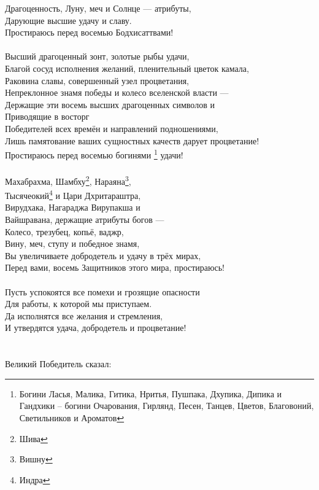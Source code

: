 Драгоценность, Луну, меч и Солнце — атрибуты,\\
Дарующие высшие удачу и славу.\\
Простираюсь перед восемью Бодхисаттвами! \\
\\
Высший драгоценный зонт, золотые рыбы удачи,\\
Благой сосуд исполнения желаний, пленительный цветок камала,\\
Раковина славы, совершенный узел процветания,\\
Непреклонное знамя победы и колесо вселенской власти —\\
Держащие эти восемь высших драгоценных символов и\\
Приводящие в восторг \\ \indent Победителей всех времён и направлений подношениями,\\
Лишь памятование ваших сущностных качеств дарует процветание!\\
Простираюсь перед восемью богинями
\footnote{ Богини Ласья, Малика, Гитика, Нритья, Пушпака, 
           Дхупика, Дипика и Гандхики – богини Очарования, 
           Гирлянд, Песен, Танцев, Цветов, Благовоний, 
           Светильников и Ароматов} удачи! \\
\\
Махабрахма, Шамбху\footnote{Шива}, Нараяна\footnote{Вишну},\\
Тысячеокий\footnote{Индра} и Цари Дхритараштра,\\
Вирудхака, Нагараджа Вирупакша и\\
Вайшравана, держащие атрибуты богов —\\
Колесо, трезубец, копьё, ваджр,\\
Вину, меч, ступу и победное знамя,\\
Вы увеличиваете добродетель и удачу в трёх мирах,\\
Перед вами, восемь Защитников этого мира, простираюсь!\\
\\
\newpage
Пусть успокоятся все помехи и грозящие опасности\\
Для работы, к которой мы приступаем.\\
Да исполнятся все желания и стремления,\\
И утвердятся удача, добродетель и процветание!\\
\\
\vspace{1cm}
\\
\scriptsize
Великий Победитель сказал:\\
